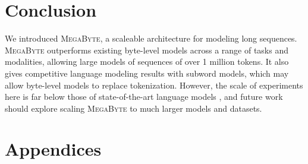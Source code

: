 \documentclass{article}
\newcommand{\fastslow}[0]{\textsc{MegaByte}\xspace}
\newcommand{\megabyte}[0]{\fastslow}
\theoremstyle{plain}
\theoremstyle{definition}
\theoremstyle{remark}
\begin{document}
\section{Conclusion}
We introduced \megabyte, a scaleable architecture for modeling long sequences.
\megabyte outperforms existing byte-level models across a range of tasks and modalities, allowing large models of sequences of over 1 million tokens.
It also gives competitive language modeling results with subword models, which may allow byte-level models to replace tokenization.
However, the scale of experiments here is far below those of state-of-the-art language models \citep{gpt3}, and future work should explore scaling \megabyte to much larger models and datasets.













\newpage
\appendix
\onecolumn
\section{Appendices}
\label{sec:appendix}
\end{document}
